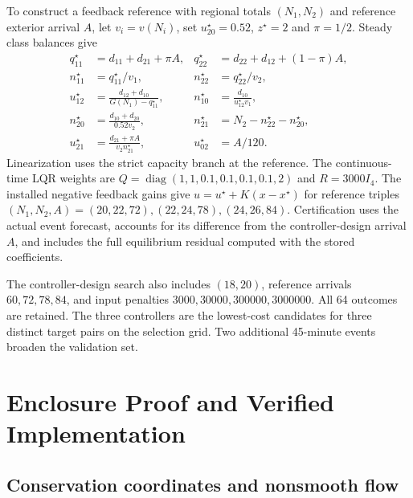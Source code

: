 \documentclass[journal,10pt]{IEEEtran}
\begin{document}
To construct a feedback reference with regional totals $(N_1,N_2)$ and
reference exterior arrival $A$, let $v_i=v(N_i)$, set
$u_{20}^\star=0.52$, $z^\star=2$ and $\pi=1/2$. Steady class balances give
\begin{equation}
\begin{aligned}
q_{11}^\star&=d_{11}+d_{21}+\pi A,&
q_{22}^\star&=d_{22}+d_{12}+(1-\pi)A,\\
n_{11}^\star&=q_{11}^\star/v_1,&
n_{22}^\star&=q_{22}^\star/v_2,\\
u_{12}^\star&=\frac{d_{12}+d_{10}}{G(N_1)-q_{11}^\star},&
n_{10}^\star&=\frac{d_{10}}{u_{12}^\star v_1},\\
n_{20}^\star&=\frac{d_{10}+d_{20}}{0.52v_2},&
n_{21}^\star&=N_2-n_{22}^\star-n_{20}^\star,\\
u_{21}^\star&=\frac{d_{21}+\pi A}{v_2n_{21}^\star},&
u_{02}^\star&=A/120.
\end{aligned}
\label{eq:new-targets}
\end{equation}
Linearization uses the strict capacity branch at the reference. The
continuous-time LQR weights are
$Q=\operatorname{diag}(1,1,0.1,0.1,0.1,0.1,2)$ and $R=3000I_4$.
The installed negative feedback gains give
$u=u^\star+K(x-x^\star)$ for reference triples
$(N_1,N_2,A)=(20,22,72),(22,24,78),(24,26,84)$.
Certification uses the actual event forecast, accounts for its difference
from the controller-design arrival $A$, and includes the full equilibrium
residual computed with the stored coefficients.

The controller-design search also includes $(18,20)$, reference arrivals
$60,72,78,84$, and input penalties $3000,30000,300000,3000000$.
All 64 outcomes are retained. The three controllers are the lowest-cost candidates for three
distinct target pairs on the selection grid. Two additional 45-minute
events broaden the validation set.

\section{Enclosure Proof and Verified Implementation}
\label{app:new-enclosure-proof}

\subsection{Conservation coordinates and nonsmooth flow}
\end{document}
